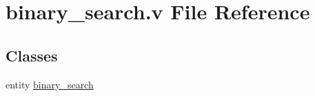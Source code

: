 \hypertarget{binary__search_8v}{}\section{binary\+\_\+search.\+v File Reference}
\label{binary__search_8v}
\subsection*{Classes}
\begin{DoxyCompactItemize}
\item 
entity \mbox{\hyperlink{enumbinary__search}{binary\+\_\+search}}
\end{DoxyCompactItemize}
